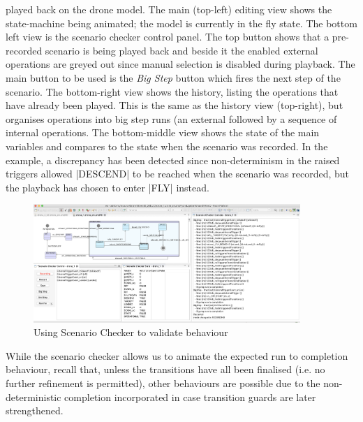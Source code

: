  played back on the drone model.
The main (top-left) editing view shows the state-machine being animated; the model is currently in the fly state.
The bottom left view is the scenario checker control panel.
The top button shows that a pre-recorded scenario is being played back and beside it the enabled external operations are greyed out since manual selection is disabled during playback.
The main button to be used is the \emph{Big Step} button which fires the next step of the scenario.
The bottom-right view shows the history, listing the operations that have already been played.
This is the same as the \PROB history view (top-right), but organises operations into big step runs (an external followed by a sequence of internal operations.
The bottom-middle view shows the state of the main variables and compares to the state when the scenario was recorded.
In the example, a discrepancy has been detected since non-determinism in the raised triggers allowed |DESCEND| to be reached when the scenario was recorded, but the playback has chosen to enter |FLY| instead.


\begin{figure}[!h]
	\centering
	\includegraphics[width=0.90\textwidth, trim=30 50 60 0]{figures/scenarioChecker_recording_drone1.png}
	\caption{Using Scenario Checker to validate behaviour}
	\label{fig:scenarioChecker_recording_drone1}
\end{figure}

While the scenario checker allows us to animate the expected run to completion behaviour, recall that, unless the transitions have all been finalised (i.e. no further refinement is permitted),  other behaviours are possible due to the non-deterministic completion incorporated in case transition guards are later strengthened. 
 

